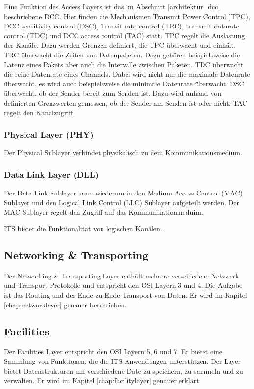 Eine Funktion des Access Layers ist das im Abschnitt \ref{architektur_dcc} beschriebene \ac{DCC}. Hier finden die Mechanismen Transmit Power Control (TPC), \ac{DCC} sensitivity control (DSC), Transit rate control (TRC), transmit datarate control (TDC) und DCC access control (TAC) statt. TPC regelt die Auslastung der Kanäle. Dazu werden Grenzen definiert, die TPC überwacht und einhält. TRC überwacht die Zeiten von Datenpaketen. Dazu gehören beispielsweise die Latenz eines Pakets aber auch die Intervalle zwischen Paketen. TDC überwacht die reine Datenrate eines Channels. Dabei wird nicht nur die maximale Datenrate überwacht, es wird auch beispielsweise die minimale Datenrate überwacht. DSC überwacht, ob der Sender bereit zum Senden ist. Dazu wird anhand von definierten Grenzwerten gemessen, ob der Sender am Senden ist oder nicht. TAC regelt den Kanalzugriff. 

\subsubsection{Physical Layer (PHY)}
Der Physical Sublayer verbindet physikalisch zu dem Kommunikationsmedium.

\subsubsection{Data Link Layer (DLL)}
Der Data Link Sublayer kann wiederum in den Medium Access Control (MAC) Sublayer und den Logical Link Control (LLC) Sublayer aufgeteilt werden. Der MAC Sublayer regelt den Zugriff auf das Kommunikationmeduim.


\ac{ITS} bietet die Funktionalität von logischen Kanälen. 




\subsection{Networking \& Transporting \label{architektur_networkingTransporting}}
Der Networking \& Transporting Layer enthält mehrere verschiedene Netzwerk und Transport Protokolle und entspricht den \ac{OSI} Layern 3 und 4. Die Aufgabe ist das Routing und der Ende zu Ende Transport von Daten. Er wird im Kapitel \ref{chap:networklayer} genauer beschrieben. 


\subsection{Facilities}
Der Facilities Layer entspricht den \ac{OSI} Layern 5, 6 und 7. Er bietet eine Sammlung von Funktionen, die die \ac{ITS} Anwendungen unterstützen. Der Layer bietet Datenstrukturen um verschiedene Date zu speichern, zu sammeln und zu verwalten. Er wird im Kapitel \ref{chap:facilitylayer} genauer erklärt.

